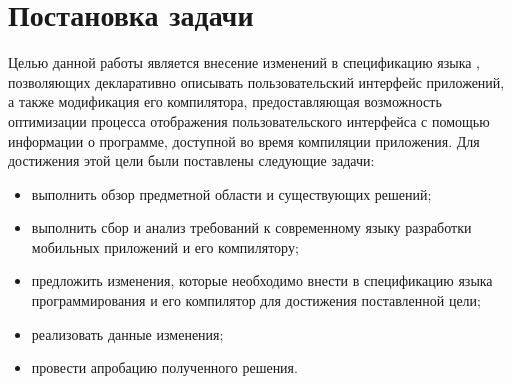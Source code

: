 \section{Постановка задачи}
Целью данной работы является внесение изменений в спецификацию языка
, позволяющих декларативно описывать пользовательский интерфейс
приложений, а также модификация его компилятора, предоставляющая возможность
оптимизации процесса отображения пользовательского интерфейса с помощью
информации о программе, доступной во время компиляции приложения.
Для достижения этой цели были поставлены следующие задачи:
\begin{itemize}
	\item выполнить обзор предметной области и существующих решений;
	\item выполнить сбор и анализ требований к современному языку разработки
	мобильных приложений и его компилятору;
	\item предложить изменения, которые необходимо внести в спецификацию языка
	программирования  и его компилятор для достижения
	поставленной цели;
	\item реализовать данные изменения;
	\item провести апробацию полученного решения.
\end{itemize}